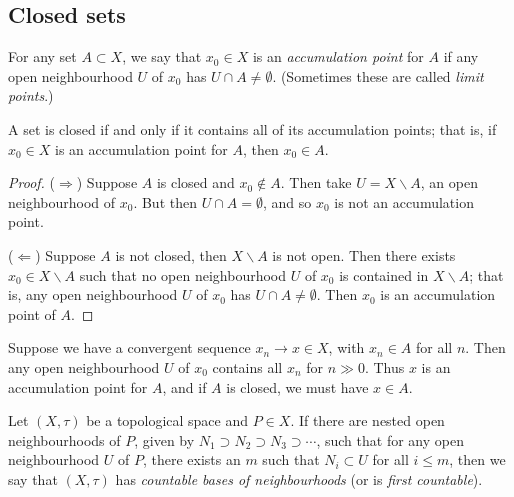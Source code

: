 
	\pagebreak

\subsection{Closed sets} %
\label{sub:closed_sets}

\begin{definition}
	For any set $A\subset X$, we say that $x_0 \in X$ is an \emph{accumulation point} for $A$ if any open neighbourhood $U$ of $x_0$ has $U \cap A \neq \emptyset$. (Sometimes these are called \emph{limit points}.)
\end{definition}

\vspace{3pt}

\begin{lemma}
	A set is closed if and only if it contains all of its accumulation points; that is, if $x_0 \in X$ is an accumulation point for $A$, then $x_0 \in A$.
\end{lemma}

\begin{proof}
	($\Rightarrow$) Suppose $A$ is closed and $x_0\not\in A$. Then take $U=X\backslash A$, an open neighbourhood of $x_0$. But then $U \cap A = \emptyset$, and so $x_0$ is not an accumulation point.
	
	($\Leftarrow$) Suppose $A$ is not closed, then $X\backslash A$ is not open. Then there exists $x_0\in X\backslash A$ such that no open neighbourhood $U$ of $x_0$ is contained in $X\backslash A$; that is, any open neighbourhood $U$ of $x_0$ has $U\cap A\neq \emptyset$. Then $x_0$ is an accumulation point of $A$.
\end{proof}

\vspace{3pt}

\begin{remark}
	Suppose we have a convergent sequence $x_n \to x \in X$, with $x_n \in A$ for all $n$. Then any open neighbourhood $U$ of $x_0$ contains all $x_n$ for $n \gg 0$. Thus $x$ is an accumulation point for $A$, and if $A$ is closed, we must have $x\in A$.
\end{remark}

\begin{definition}
	Let $(X,\tau)$ be a topological space and $P\in X$. If there are nested open neighbourhoods of $P$, given by $N_1 \supset N_2 \supset N_3 \supset \cdots$, such that for any open neighbourhood $U$ of $P$, there exists an $m$ such that $N_i \subset U$ for all $i\leq m$, then we say that $(X,\tau)$ has \emph{countable bases of neighbourhoods} (or is \emph{first countable}).
\end{definition}

